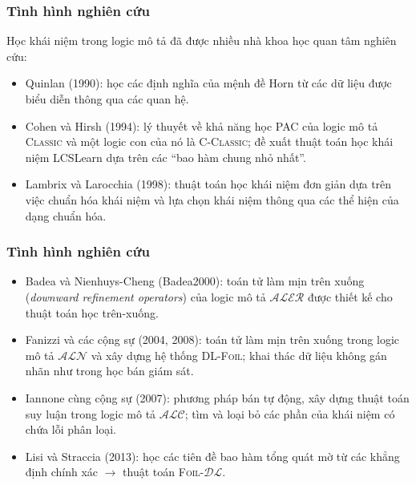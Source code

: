 \documentclass[fleqn]{beamer}
\newcommand{\ALC}		{$\mathcal{ALC}$\xspace}
\newcommand{\ALN}		{$\mathcal{ALN}$\xspace}
\newcommand{\ALER}		{$\mathcal{ALER}$\xspace}
\begin{document}
\begin{frame}\frametitle{\bf Tình hình nghiên cứu}
Học khái niệm trong logic mô tả đã được nhiều nhà khoa học quan tâm nghiên cứu:
\vspace{1.0ex}
\begin{itemize}
  \item Quinlan (1990): học các định nghĩa của mệnh đề Horn từ các dữ liệu được biểu diễn thông qua các quan hệ. 
  \vspace{1.0ex}
  
  \item Cohen và Hirsh (1994): lý thuyết về khả năng học PAC của logic mô tả \textsc{Classic} và một logic con của nó là \textsc{C-Classic}; đề xuất thuật toán học khái niệm LCSLearn dựa trên các ``bao hàm chung nhỏ nhất''.
  \vspace{1.0ex}
  
  \item Lambrix và Larocchia (1998): thuật toán học khái niệm đơn giản dựa trên việc chuẩn hóa khái niệm và lựa chọn khái niệm thông qua các thể hiện của dạng chuẩn hóa. 
  \vspace{1.0ex}
\end{itemize}
\end{frame}
\begin{frame}\frametitle{\bf Tình hình nghiên cứu}
\begin{itemize}
  \item Badea và Nienhuys-Cheng (Badea2000): toán tử làm mịn trên xuống ({\em downward refinement operators}) của logic mô tả \ALER được thiết kế cho thuật toán học trên-xuống.
  \vspace{1.0ex}
  
  \item Fanizzi và các cộng sự (2004, 2008): toán tử làm mịn trên xuống trong logic mô tả \ALN và xây dựng hệ thống \textsc{DL-Foil}; khai thác dữ liệu không gán nhãn như trong học bán giám sát.
  \vspace{1.0ex}
   
  \item Iannone cùng cộng sự (2007): phương pháp bán tự động, xây dựng thuật toán suy luận trong logic mô tả \ALC; tìm và loại bỏ các phần của khái niệm có chứa lỗi phân loại.
  \vspace{1.0ex}  
  \item Lisi và Straccia (2013): học các tiên đề bao hàm tổng quát mờ từ các khẳng định chính xác $\rightarrow$ thuật toán \textsc{Foil-}$\mathcal{DL}$.
\end{itemize}
\end{frame}
\end{document}

